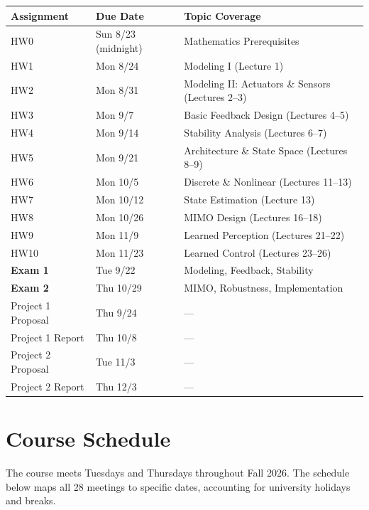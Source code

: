 \documentclass[11pt,letterpaper]{article}
\begin{document}
\begin{table}[h]
\begin{tabularx}{\linewidth}{llX}
\toprule
\textbf{Assignment} & \textbf{Due Date} & \textbf{Topic Coverage} \\
\midrule
HW0 & Sun 8/23 (midnight) & Mathematics Prerequisites \\
HW1 & Mon 8/24 & Modeling I (Lecture 1) \\
HW2 & Mon 8/31 & Modeling II: Actuators \& Sensors (Lectures 2--3) \\
HW3 & Mon 9/7 & Basic Feedback Design (Lectures 4--5) \\
HW4 & Mon 9/14 & Stability Analysis (Lectures 6--7) \\
HW5 & Mon 9/21 & Architecture \& State Space (Lectures 8--9) \\
HW6 & Mon 10/5 & Discrete \& Nonlinear (Lectures 11--13) \\
HW7 & Mon 10/12 & State Estimation (Lecture 13) \\
HW8 & Mon 10/26 & MIMO Design (Lectures 16--18) \\
HW9 & Mon 11/9 & Learned Perception (Lectures 21--22) \\
HW10 & Mon 11/23 & Learned Control (Lectures 23--26) \\
\midrule
\textbf{Exam 1} & Tue 9/22 & Modeling, Feedback, Stability \\
\textbf{Exam 2} & Thu 10/29 & MIMO, Robustness, Implementation \\
\midrule
Project 1 Proposal & Thu 9/24 & --- \\
Project 1 Report & Thu 10/8 & --- \\
Project 2 Proposal & Tue 11/3 & --- \\
Project 2 Report & Thu 12/3 & --- \\
\bottomrule
\end{tabularx}
\label{tab:assignments}
\end{table}

\newpage


\section*{Course Schedule}

The course meets Tuesdays and Thursdays throughout Fall 2026. The schedule below maps all 28 meetings to specific dates, accounting for university holidays and breaks.
\end{document}
